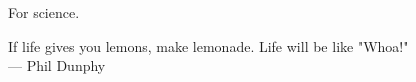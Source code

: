 \clearpage
\thispagestyle{empty}
{}

\null\vfill

\begin{center}
\Large{For science.\\}
\end{center}

\begin{flushright}
\large{If life gives you lemons, make lemonade. Life will be like "Whoa!"\\}
--- Phil Dunphy
\end{flushright}




\vfill\vfill

\clearpage
